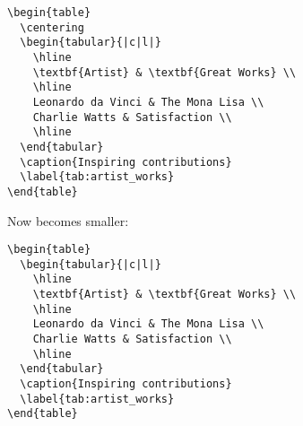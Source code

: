 \documentclass[pagesize=auto]{scrbook}
\begin{document}
\begin{verbatim}
\begin{table}
  \centering
  \begin{tabular}{|c|l|}
    \hline
    \textbf{Artist} & \textbf{Great Works} \\
    \hline
    Leonardo da Vinci & The Mona Lisa \\
    Charlie Watts & Satisfaction \\
    \hline
  \end{tabular}
  \caption{Inspiring contributions}
  \label{tab:artist_works}
\end{table}
\end{verbatim}

Now becomes smaller:

\begin{Verbatim}[fontsize=\footnotesize]
  \begin{table}
  \begin{tabular}{|c|l|}
    \hline
    \textbf{Artist} & \textbf{Great Works} \\
    \hline
    Leonardo da Vinci & The Mona Lisa \\
    Charlie Watts & Satisfaction \\
    \hline
  \end{tabular}
  \caption{Inspiring contributions}
  \label{tab:artist_works}
\end{table}
\end{Verbatim}
\end{document}
